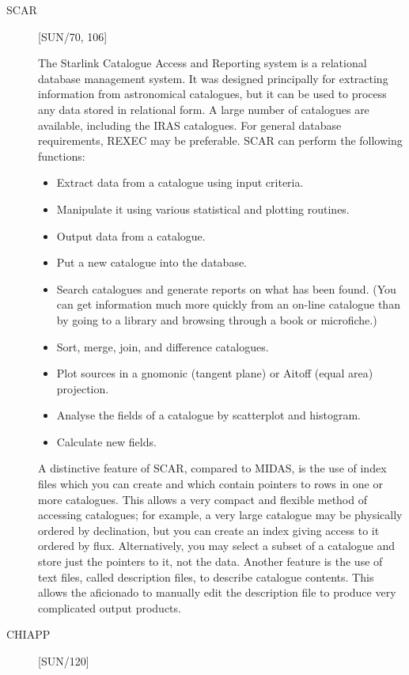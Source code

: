 \begin{description}

\item [SCAR] \hfill [SUN/70, 106]

The Starlink Catalogue Access and Reporting system is a relational database
management system.
It was designed principally for extracting information from astronomical
catalogues, but it can be used to process any data stored in relational form.
A large number of catalogues are available, including the IRAS catalogues.
For general database requirements, REXEC may be preferable.
SCAR can perform the following functions:
\begin{itemize}
\item Extract data from a catalogue using input criteria.
\item Manipulate it using various statistical and plotting routines.
\item Output data from a catalogue.
\item Put a new catalogue into the database.
\item Search catalogues and generate reports on what has been found.
 (You can get information much more quickly from an on-line catalogue than by
 going to a library and browsing through a book or microfiche.)
\item Sort, merge, join, and difference catalogues.
\item Plot sources in a gnomonic (tangent plane) or Aitoff (equal area)
 projection.
\item Analyse the fields of a catalogue by scatterplot and histogram.
\item Calculate new fields.
\end{itemize}
A distinctive feature of SCAR, compared to MIDAS, is the use of index files
which you can create and which contain pointers to rows in one or more
catalogues.
This allows a very compact and flexible method of accessing catalogues;
for example, a very large catalogue may be physically ordered by declination,
but you can create an index giving access to it ordered by flux.
Alternatively, you may select a subset of a catalogue and store just the
pointers to it, not the data.
Another feature is the use of text files, called description files, to describe
catalogue contents.
This allows the aficionado to manually edit the description file to produce very
complicated output products.

\item [CHIAPP] \hfill [SUN/120]


\end{description}
